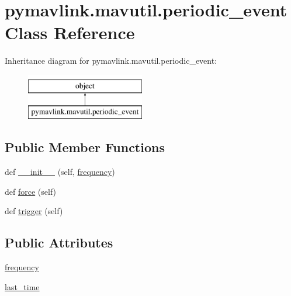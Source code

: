 \hypertarget{classpymavlink_1_1mavutil_1_1periodic__event}{}\section{pymavlink.\+mavutil.\+periodic\+\_\+event Class Reference}
\label{classpymavlink_1_1mavutil_1_1periodic__event}
Inheritance diagram for pymavlink.\+mavutil.\+periodic\+\_\+event\+:\begin{figure}[H]
\begin{center}
\leavevmode
\includegraphics[height=2.000000cm]{classpymavlink_1_1mavutil_1_1periodic__event}
\end{center}
\end{figure}
\subsection*{Public Member Functions}
\begin{DoxyCompactItemize}
\item 
def \mbox{\hyperlink{classpymavlink_1_1mavutil_1_1periodic__event_af45cf18064b3defb11eb5581b101be7e}{\+\_\+\+\_\+init\+\_\+\+\_\+}} (self, \mbox{\hyperlink{classpymavlink_1_1mavutil_1_1periodic__event_aa08aac52084bedb4cefac51ee2421e99}{frequency}})
\item 
def \mbox{\hyperlink{classpymavlink_1_1mavutil_1_1periodic__event_a2a5504d296287adeb13b14a5476977ef}{force}} (self)
\item 
def \mbox{\hyperlink{classpymavlink_1_1mavutil_1_1periodic__event_ae4845b6df5d98c26357ca74346df1363}{trigger}} (self)
\end{DoxyCompactItemize}
\subsection*{Public Attributes}
\begin{DoxyCompactItemize}
\item 
\mbox{\hyperlink{classpymavlink_1_1mavutil_1_1periodic__event_aa08aac52084bedb4cefac51ee2421e99}{frequency}}
\item 
\mbox{\hyperlink{classpymavlink_1_1mavutil_1_1periodic__event_ab270b81812ba5bdd088a807ed240d8f5}{last\+\_\+time}}
\end{DoxyCompactItemize}
